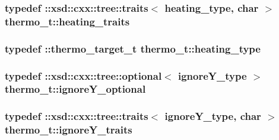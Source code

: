 \subsubsection[{\texorpdfstring{heating\+\_\+traits}{heating_traits}}]{\setlength{\rightskip}{0pt plus 5cm}typedef \+::xsd\+::cxx\+::tree\+::traits$<$ {\bf heating\+\_\+type}, char $>$ {\bf thermo\+\_\+t\+::heating\+\_\+traits}}\hypertarget{classthermo__t_adb14cdd53e4543425bb71da6fbb034d5}{}\label{classthermo__t_adb14cdd53e4543425bb71da6fbb034d5}
\subsubsection[{\texorpdfstring{heating\+\_\+type}{heating_type}}]{\setlength{\rightskip}{0pt plus 5cm}typedef \+::{\bf thermo\+\_\+target\+\_\+t} {\bf thermo\+\_\+t\+::heating\+\_\+type}}\hypertarget{classthermo__t_a53d64092b110ebaf8c36a23a2c9c40ec}{}\label{classthermo__t_a53d64092b110ebaf8c36a23a2c9c40ec}
\subsubsection[{\texorpdfstring{ignore\+Y\+\_\+optional}{ignoreY_optional}}]{\setlength{\rightskip}{0pt plus 5cm}typedef \+::xsd\+::cxx\+::tree\+::optional$<$ {\bf ignore\+Y\+\_\+type} $>$ {\bf thermo\+\_\+t\+::ignore\+Y\+\_\+optional}}\hypertarget{classthermo__t_a95e0efa769cf6e41e4851c821fde82a9}{}\label{classthermo__t_a95e0efa769cf6e41e4851c821fde82a9}
\subsubsection[{\texorpdfstring{ignore\+Y\+\_\+traits}{ignoreY_traits}}]{\setlength{\rightskip}{0pt plus 5cm}typedef \+::xsd\+::cxx\+::tree\+::traits$<$ {\bf ignore\+Y\+\_\+type}, char $>$ {\bf thermo\+\_\+t\+::ignore\+Y\+\_\+traits}}\hypertarget{classthermo__t_a73de5c924d01c03f5d5dda8f571a2f9b}{}\label{classthermo__t_a73de5c924d01c03f5d5dda8f571a2f9b}
